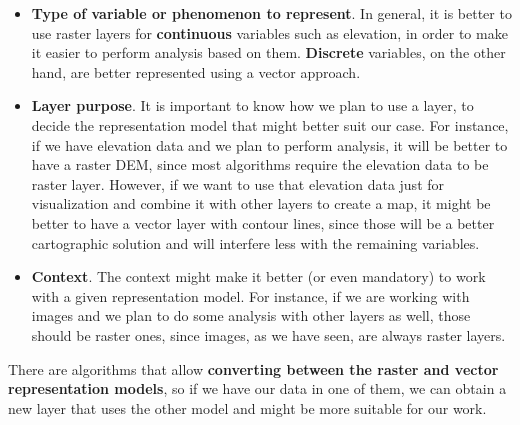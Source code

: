 \begin{itemize}
 \item \textbf{Type of variable or phenomenon to represent}. In general, it is better to use raster layers for \textbf{continuous} variables such as elevation, in order to make it easier to perform analysis based on them. \textbf{Discrete} variables, on the other hand, are better represented using a vector approach.
\item \textbf{Layer purpose}. It is important to know how we plan to use a layer, to decide the representation model that might better suit our case. For instance, if we have elevation data and we plan to perform analysis, it will be better to have a raster DEM, since most algorithms require the elevation data to be raster layer. However, if we want to use that elevation data just for visualization and combine it with other layers to create a map, it might be better to have a vector layer with contour lines, since those will be a better cartographic solution and will interfere less with the remaining variables. 
\item \textbf{Context}. The context might make it better (or even mandatory) to work with a given representation model. For instance, if we are working with images and we plan to do some analysis with other layers as well, those should be raster ones, since images, as we have seen, are always raster layers.
\end{itemize}

There are algorithms that allow \textbf{converting between the raster and vector representation models}, so if we have our data in one of them, we can obtain a new layer that uses the other model and might be more suitable for our work.

\pagestyle{empty}